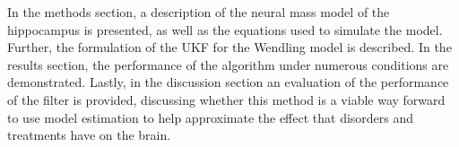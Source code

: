 In the methods section, a description of the neural mass model of the hippocampus is presented, as well as the equations used to simulate the model. Further, the formulation of the UKF for the Wendling model is described. In the results section, the performance of the algorithm under numerous conditions are demonstrated. Lastly, in the discussion section an evaluation of the performance of the filter is provided, discussing whether this method is a viable way forward to use model estimation to help approximate the effect that disorders and treatments have on the brain. 